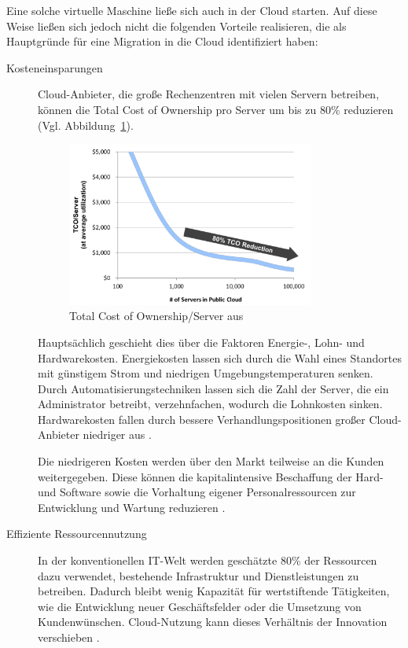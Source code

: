 Eine solche virtuelle Maschine ließe sich auch in der Cloud starten. Auf diese 
Weise ließen sich jedoch nicht die folgenden Vorteile realisieren, die 
 als Hauptgründe für eine Migration in die 
Cloud identifiziert haben:
\begin{description}
	\item[Kosteneinsparungen] Cloud-Anbieter, die große Rechenzentren
mit vielen Servern betreiben, können die Total Cost of Ownership pro Server um
bis zu 80\% reduzieren (Vgl. Abbildung~\ref{fig:tco_reduction}).

\begin{figure}[!h]
\begin{center}
\includegraphics[width=0.8\textwidth]{images/tco_reduction.png}
\caption{Total Cost of Ownership/Server
aus \protect{}}
\label{fig:tco_reduction}
\end{center}
\end{figure}
 Hauptsächlich geschieht dies über die Faktoren Energie-, Lohn- und
Hardwarekosten. Energiekosten lassen sich durch die Wahl eines Standortes
mit günstigem Strom und niedrigen Umgebungstemperaturen senken. Durch
Automatisierungstechniken lassen sich die Zahl der Server, die ein Administrator
betreibt, verzehnfachen, wodurch die Lohnkosten sinken. Hardwarekosten fallen
durch bessere Verhandlungspositionen großer Cloud-Anbieter niedriger aus 
.

Die niedrigeren Kosten werden über den Markt teilweise an die Kunden weitergegeben. Diese
können die kapitalintensive Beschaffung der Hard- und Software sowie die
Vorhaltung eigener Personalressourcen zur Entwicklung und Wartung reduzieren .

	\item[Effiziente Ressourcennutzung] In der konventionellen IT-Welt
werden geschätzte 80\% der Ressourcen dazu verwendet, bestehende Infrastruktur
und Dienstleistungen zu betreiben. Dadurch bleibt wenig Kapazität für wertstiftende
Tätigkeiten, wie die Entwicklung neuer Geschäftsfelder oder die Umsetzung von
Kundenwünschen. Cloud-Nutzung kann
dieses Verhältnis der Innovation verschieben .


\end{description}
